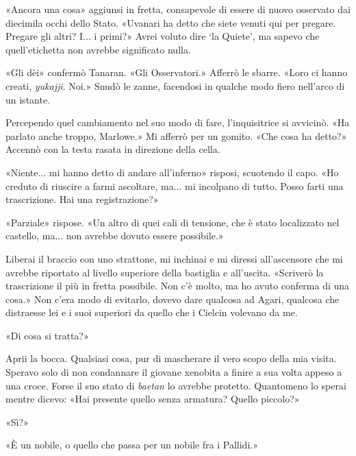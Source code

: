 «Ancora una cosa» aggiunsi in fretta, consapevole di essere di nuovo
osservato dai diecimila occhi dello Stato. «Uvanari ha detto che siete
venuti qui per pregare. Pregare gli altri? I... i primi?» Avrei voluto
dire `la Quiete', ma sapevo che quell'etichetta non avrebbe significato
nulla.

«Gli dèi» confermò Tanaran. «Gli Osservatori.» Afferrò le sbarre. «Loro
ci hanno creati, \emph{yukajji}. Noi.» Snudò le zanne, facendosi in
qualche modo fiero nell'arco di un istante.

Percependo quel cambiamento nel suo modo di fare, l'inquisitrice si
avvicinò. «Ha parlato anche troppo, Marlowe.» Mi afferrò per un gomito.
«Che cosa ha detto?» Accennò con la testa rasata in direzione della
cella.

«Niente... mi hanno detto di andare all'inferno» risposi, scuotendo il
capo. «Ho creduto di riuscire a farmi ascoltare, ma... mi incolpano di
tutto. Posso farti una trascrizione. Hai una registrazione?»

«Parziale» rispose. «Un altro di quei cali di tensione, che è stato
localizzato nel castello, ma... non avrebbe dovuto essere possibile.»

Liberai il braccio con uno strattone, mi inchinai e mi diressi
all'ascensore che mi avrebbe riportato al livello superiore della
bastiglia e all'uscita. «Scriverò la trascrizione il più in fretta
possibile. Non c'è molto, ma ho avuto conferma di una cosa.» Non c'era
modo di evitarlo, dovevo dare qualcosa ad Agari, qualcosa che distraesse
lei e i suoi superiori da quello che i Cielcin volevano da me.

«Di cosa si tratta?»

Aprii la bocca. Qualsiasi cosa, pur di mascherare il vero scopo della
mia visita. Speravo solo di non condannare il giovane xenobita a finire
a sua volta appeso a una croce. Forse il suo stato di \emph{baetan} lo
avrebbe protetto. Quantomeno lo sperai mentre dicevo: «Hai presente
quello senza armatura? Quello piccolo?»

«Sì?»

«È un nobile, o quello che passa per un nobile fra i Pallidi.»

